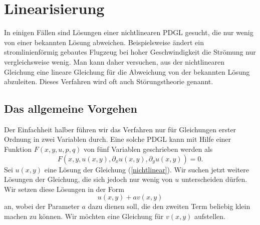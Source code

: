 %
%
%
\section{Linearisierung}
In einigen Fällen sind Lösungen einer nichtlinearen PDGL gesucht, die 
nur wenig von einer bekannten Lösung abweichen. Beispielsweise ändert
ein stromlinienförmig gebautes Flugzeug bei hoher Geschwindigkeit die
Strömung nur vergleichsweise wenig. Man kann daher versuchen, aus der
nichtlinearen Gleichung eine lineare Gleichung für die Abweichung
von der bekannten Lösung abzuleiten. Dieses Verfahren wird oft auch
Störungstheorie genannt.

\subsection{Das allgemeine Vorgehen}
Der Einfachheit halber führen wir das Verfahren nur für Gleichungen
erster Ordnung in zwei Variablen durch. Eine solche PDGL kann mit Hilfe
einer Funktion $F(x,y,u,p,q)$ von fünf Variablen geschrieben werden als
\begin{equation}
F(x,y,u(x,y), \partial_xu(x,y),\partial_yu(x,y))=0.
\label{nichtlinear}
\end{equation}
Sei $u(x,y)$ eine Lösung der Gleichung (\ref{nichtlinear}). Wir suchen
jetzt weitere Lösungen der Gleichung, die sich jedoch nur wenig von
$u$ unterscheiden dürfen. Wir setzen diese Lösungen in der Form
\begin{equation}
u(x,y)+av(x,y)
\label{linearisierungansatz}
\end{equation}
an, wobei der Parameter $a$ dazu dienen soll, die den
zweiten Term beliebig klein machen zu können. Wir möchten eine Gleichung
für $v(x,y)$ aufstellen.

